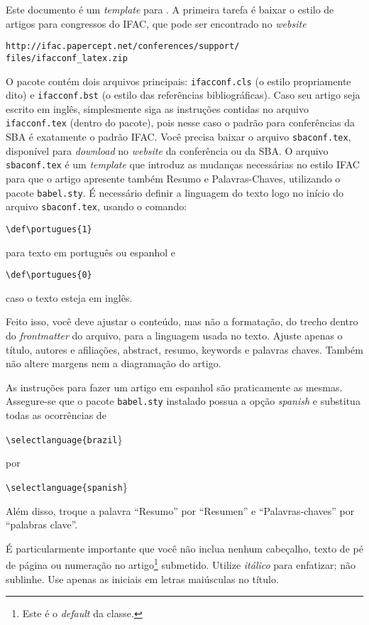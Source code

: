 \documentclass[a4paper]{ifacconf}
\def\portugues{1}
\def\portugues{0}
\begin{document}
Este documento é um {\em template} para \LaTeXe. A primeira tarefa é baixar o estilo de artigos para congressos do IFAC, que pode ser encontrado no {\em website}

{\tt http://ifac.papercept.net/conferences/support/}\\
{\tt	files/ifacconf\_latex.zip}


O pacote contém dois arquivos principais: \texttt{ifacconf.cls} (o estilo propriamente dito) e \texttt{ifacconf.bst} (o estilo das referências bibliográficas). Caso seu artigo seja escrito em inglês, simplesmente siga as instruções contidas no arquivo \texttt{ifacconf.tex} (dentro do pacote), pois nesse caso o padrão para conferências da SBA é exatamente o padrão IFAC. 
Você precisa baixar o arquivo \texttt{sbaconf.tex}, disponível para {\em download} no {\em website} da conferência ou da SBA. O arquivo \texttt{sbaconf.tex} é um {\em template} que introduz as mudanças necessárias no estilo IFAC para que o artigo apresente também Resumo e Palavras-Chaves, utilizando o pacote \texttt{babel.sty}. É necessário definir a linguagem do texto logo no início do arquivo \texttt{sbaconf.tex}, usando o comando:

\begin{verbatim}
\def\portugues{1}  
\end{verbatim}
para texto em português ou espanhol e 

\begin{verbatim}
\def\portugues{0}  
\end{verbatim}
caso o texto esteja em inglês.


Feito isso, você deve ajustar o conteúdo, mas não a formatação, do trecho dentro do {\em frontmatter} do arquivo, para 
a linguagem usada no texto. Ajuste apenas o título, autores e afiliações, abstract, resumo, keywords e palavras chaves. Também não altere  margens nem a diagramação do artigo.

As instruções para fazer um artigo em espanhol são praticamente as mesmas. Assegure-se que o pacote \texttt{babel.sty} instalado possua a opção {\em spanish} e substitua todas as ocorrências de

{\tt \textbackslash selectlanguage\{brazil}\}

por 

{\tt \textbackslash selectlanguage\{spanish}\}

Além disso, troque a palavra ``Resumo'' por ``Resumen'' e  ``Palavras-chaves'' por ``palabras clave''.


É particularmente importante 
que você não inclua nenhum cabeçalho, texto de pé de página ou numeração 
no artigo\footnote{Este é o {\em default} da classe.} submetido.
Utilize \emph{itálico} para enfatizar; não sublinhe. 
Use apenas as iniciais em letras maiúsculas no título. 
\end{document}
